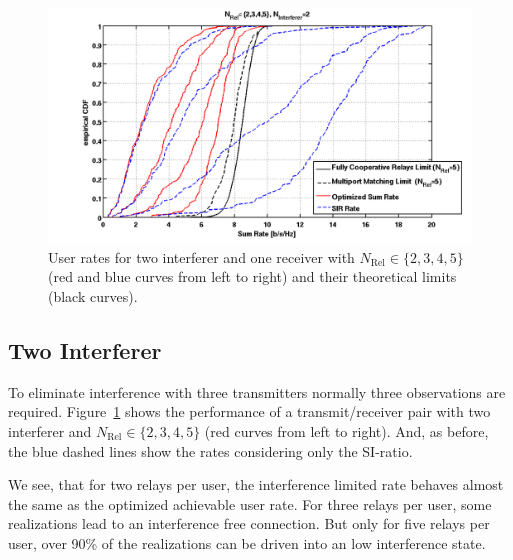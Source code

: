 \begin{figure}[h]
\centering
  \includegraphics[width=0.85\linewidth]{images/Relcomparison_2interferer.png}
\caption{User rates for two interferer and one receiver with  $N_\text{Rel}\in\{2,3,4,5\}$ (red and blue curves from left to right) and their theoretical limits (black curves).}
\label{fig:relcomp_2}
\end{figure}
\subsection{Two Interferer}
\label{sec:2interf}
To eliminate interference with three transmitters normally three observations are required.
Figure~\ref{fig:relcomp_2} shows the performance of a transmit/receiver pair with two interferer and $N_\text{Rel}\in\{2,3,4,5\}$ (red curves from left to right).
And, as before, the blue dashed lines show the rates considering only the SI-ratio.

We see, that for two relays per user, the interference limited rate behaves almost the same as the optimized achievable user rate.
For three relays per user, some realizations lead to an interference free connection.
But only for five relays per user, over 90\% of the realizations can be driven into an low interference state.

